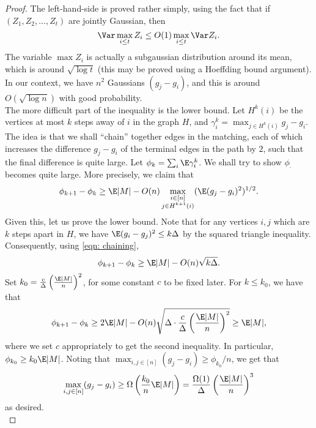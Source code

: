 	\begin{proof}%
		The left-hand-side is proved rather simply, using the fact that if $(Z_1,Z_2,\ldots,Z_t)$ are jointly Gaussian, then
		\begin{equation}
			\label{eqn: var-max-gauss}
			\Var \max_{i \le t} Z_i \le O(1) \max_{i \le t} \Var Z_i.
		\end{equation}
		The variable $\max Z_i$ is actually a subgaussian distribution around its mean, which is around $\sqrt{\log t}$ (this may be proved using a Hoeffding bound argument). In our context, we have $n^2$ Gaussians $(g_j - g_i)$, and this is around $O(\sqrt{\log n})$ with good probability.\\

		The more difficult part of the inequality is the lower bound. Let $H^k(i)$ be the vertices at most $k$ steps away of $i$ in the graph $H$, and $\gamma_i^k = \max_{j \in H^k(i)} g_j - g_i$. The idea is that we shall ``chain'' together edges in the matching, each of which increases the difference $g_j - g_i$ of the terminal edges in the path by $2$, such that the final difference is quite large. Let $\phi_k = \sum_i \E \gamma_i^k$. We shall try to show $\phi_\cdot$ becomes quite large. More precisely, we claim that
		\begin{equation}
			\label{eqn: chaining}
			\phi_{k+1} - \phi_k \ge \E |M| - O(n) \max_{\substack{i \in [n] \\ j \in H^{k+1}(i)}} (\E (g_j - g_i)^2)^{1/2}.
		\end{equation}
		Given this, let us prove the lower bound. Note that for any vertices $i,j$ which are $k$ steps apart in $H$, we have $\E (g_i - g_j)^2 \le k\Delta$ by the squared triangle inequality. Consequently, using \eqref{eqn: chaining},
		\[ \phi_{k+1} - \phi_k \ge \E |M| - O(n) \sqrt{k\Delta}. \]
		Set $k_0 = \frac{c}{\Delta} \left(\frac{\E|M|}{n}\right)^2$, for some constant $c$ to be fixed later. For $k \le k_0$, we have that
		\[ \phi_{k+1} - \phi_k \ge 2 \E |M| - O(n) \sqrt{\Delta \cdot \frac{c}{\Delta} \left(\frac{\E|M|}{n}\right)^2} \ge \E |M|, \]
		where we set $c$ appropriately to get the second inequality. In particular, $\phi_{k_0} \ge k_0 \E|M|$. Noting that $\max_{i,j \in [n]} (g_j - g_i) \ge \phi_{k_0}/n$, we get that
		\[ \max_{i,j \in [n]} (g_j - g_i) \ge \Omega\left(\frac{k_0}{n}\E |M|\right) = \frac{\Omega(1)}{\Delta} \left(\frac{\E|M|}{n}\right)^3 \]
		as desired.\\


\end{proof}
